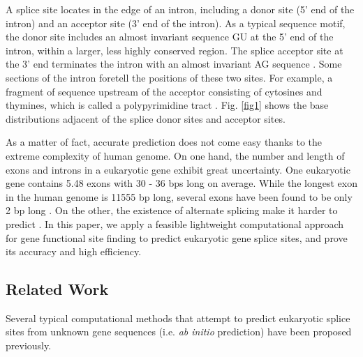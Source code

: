 \documentclass[journal,twoside]{IEEEtran}
\begin{document}
A splice site locates in the edge of an intron, including a donor site (5' end of the intron) and an acceptor site (3' end of the intron). As a typical sequence motif, the donor site includes an almost invariant sequence GU at the 5' end of the intron, within a larger, less highly conserved region. The splice acceptor site at the 3' end terminates the intron with an almost invariant AG sequence \cite{black2003mechanisms}.  Some sections of the intron foretell the positions of these two sites. For example, a fragment of sequence upstream of the acceptor consisting of cytosines and thymines, which is called a polypyrimidine tract \cite{lodish2008molecular}. Fig. \ref{fig1} shows the base distributions adjacent of the splice donor sites and acceptor sites. 

As a matter of fact, accurate prediction does not come easy thanks to the extreme complexity of human genome. On one hand, the number and length of exons and introns in a eukaryotic gene exhibit great uncertainty. One eukaryotic gene contains 5.48 exons with 30 - 36 bps long on average. While the longest exon in the human genome is 11555 bp long, several exons have been found to be only 2 bp long \cite{sakharkar2004distributions}. On the other, the existence of alternate splicing make it harder to predict \cite{black2003mechanisms}. In this paper, we apply a feasible lightweight computational approach for gene functional site finding to predict eukaryotic gene splice sites, and prove its accuracy and high efficiency. 

\subsection{Related Work}\label{1.1}

Several typical computational methods that attempt to predict eukaryotic splice sites from unknown gene sequences (i.e. \textsl{ab initio} prediction) have been proposed previously. 
\end{document}
